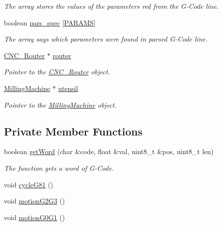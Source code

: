 \begin{DoxyCompactItemize}
\begin{DoxyCompactList}\small\item\em The array stores the values of the parameters red from the G-\/\+Code line. \end{DoxyCompactList}\item 
boolean \hyperlink{class_g_code_a6d11b02685ef1b387a3c9da004547006}{pars\+\_\+spec} \mbox{[}\hyperlink{_g_code__def_8h_ab0b1e59d96396ba9dca2147f9feb44eb}{P\+A\+R\+A\+M\+S}\mbox{]}
\begin{DoxyCompactList}\small\item\em The array says which parameters were found in parsed G-\/\+Code line. \end{DoxyCompactList}\item 
\hyperlink{class_c_n_c___router}{C\+N\+C\+\_\+\+Router} $\ast$ \hyperlink{class_g_code_ab060bb5bd169ae7640eb781bef6b78fe}{router}
\begin{DoxyCompactList}\small\item\em Pointer to the \hyperlink{class_c_n_c___router}{C\+N\+C\+\_\+\+Router} object. \end{DoxyCompactList}\item 
\hyperlink{class_milling_machine}{Milling\+Machine} $\ast$ \hyperlink{class_g_code_a9a737c33f133cf515926d0f2b612bd22}{utensil}
\begin{DoxyCompactList}\small\item\em Pointer to the \hyperlink{class_milling_machine}{Milling\+Machine} object. \end{DoxyCompactList}\end{DoxyCompactItemize}
\subsection*{Private Member Functions}
\begin{DoxyCompactItemize}
\item 
boolean \hyperlink{class_g_code_a3c842609b871f6d8f15f38d1f5dd813b}{get\+Word} (char \&code, float \&val, uint8\+\_\+t \&pos, uint8\+\_\+t len)
\begin{DoxyCompactList}\small\item\em The function gets a word of G-\/\+Code. \end{DoxyCompactList}\item 
void \hyperlink{class_g_code_ad754ef6693a2b3422c6adaafbc8a2f79}{cycle\+G81} ()
\item 
void \hyperlink{class_g_code_a44eabd18f470e248fed7a53df495d05f}{motion\+G2\+G3} ()
\item 
void \hyperlink{class_g_code_a74e9e50305d574e214eb8b5a7c55a9f6}{motion\+G0\+G1} ()
\end{DoxyCompactItemize}


